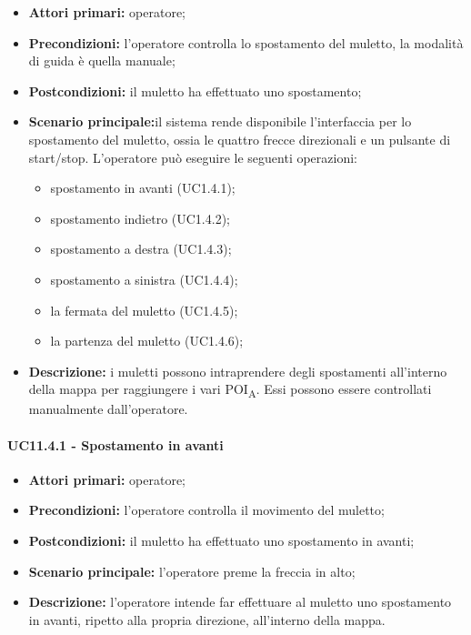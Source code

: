 \begin{itemize}
	\item 	\textbf{Attori primari:} operatore;
	\item 	\textbf{Precondizioni:} l'operatore controlla lo spostamento del muletto, la modalità di guida è quella manuale;
	\item 	\textbf{Postcondizioni:} il muletto ha effettuato uno spostamento;
	\item 	\textbf{Scenario principale:}il sistema rende disponibile l'interfaccia per lo spostamento del muletto, ossia le quattro frecce direzionali e un pulsante di start/stop. L'operatore può eseguire le seguenti operazioni:
	\begin{itemize}
		\item spostamento in avanti (UC1.4.1); 
		\item spostamento indietro (UC1.4.2);
		\item spostamento a destra (UC1.4.3);
		\item spostamento a sinistra (UC1.4.4);
		\item la fermata del muletto (UC1.4.5);
		\item la partenza del muletto (UC1.4.6);
	\end{itemize}
	\item 	\textbf{Descrizione:} i muletti possono intraprendere degli spostamenti all'interno della mappa per raggiungere i vari POI\textsubscript{A}. Essi possono essere controllati manualmente dall'operatore.
\end{itemize}


\paragraph{UC11.4.1 - Spostamento in avanti}
\begin{itemize}
	\item 	\textbf{Attori primari:} operatore;
	\item 	\textbf{Precondizioni:} l'operatore controlla il movimento del muletto;
	\item 	\textbf{Postcondizioni:} il muletto ha effettuato uno spostamento in avanti; 
	\item 	\textbf{Scenario principale:} l'operatore preme la freccia in alto;
	\item 	\textbf{Descrizione:} l'operatore intende far effettuare al muletto uno spostamento in avanti, ripetto alla propria direzione, all'interno della mappa.

\end{itemize}

